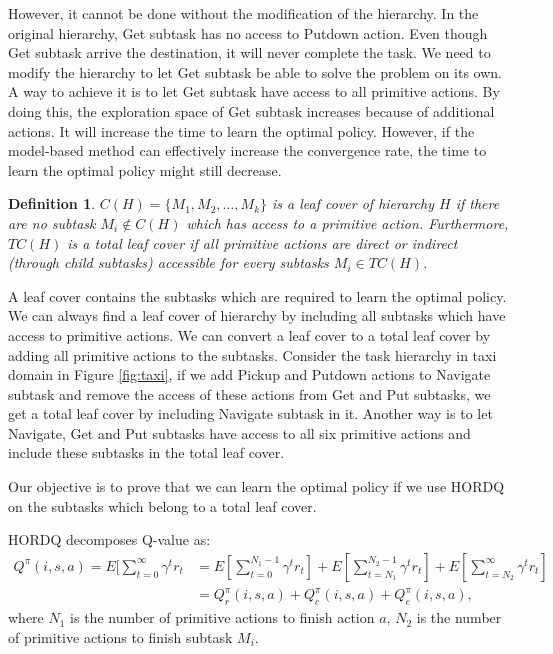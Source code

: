 \documentclass{article} %
\newtheorem{definition}{Definition}
\begin{document}
However, it cannot be done without the modification of the hierarchy. In the original hierarchy, 
Get subtask has no access to Putdown action. Even though Get subtask arrive the destination,
it will never complete the task. We need to modify the hierarchy to let Get subtask be
able to solve the problem on its own. A way to achieve it is to let Get subtask have access
to all primitive actions. By doing this, the exploration space of Get subtask increases
because of additional actions. It will increase 
the time to learn the optimal policy. However, if the model-based method can effectively increase
the convergence rate, the time to learn the optimal policy might still decrease.


\begin{definition}
    $C(H) = \{M_1, M_2, \dots, M_k\}$ is a leaf cover of hierarchy $H$ 
    if there are no subtask $M_i \notin C(H)$ which has access to a primitive action.
    Furthermore, $TC(H)$ is a total leaf cover if all primitive actions are direct or indirect (through child subtasks) accessible for every 
    subtasks $M_i \in TC(H)$.
\end{definition}

A leaf cover contains the subtasks which are required to learn the optimal policy.
We can always find a leaf cover of hierarchy by including all subtasks which have access
to primitive actions. We can convert a leaf cover to a total leaf cover by 
adding all primitive actions to the subtasks. 
Consider the task hierarchy in taxi domain in Figure \ref{fig:taxi},
if we add Pickup and Putdown actions to Navigate subtask and remove the access of these actions from Get and Put subtasks,
we get a total leaf cover by including Navigate subtask in it. Another way is to let Navigate, Get and Put subtasks
have access to all six primitive actions and include these subtasks in the total leaf cover. 

Our objective is to prove that we can learn the optimal policy if we use HORDQ \cite{HORDQ} on the subtasks which 
belong to a total leaf cover.

HORDQ decomposes Q-value as:
\begin{align}
    \label{eq:HordQ}
    Q^{\pi}(i, s, a) = E[\sum_{t=0}^{\infty}\gamma^t r_t &= E[\sum_{t=0}^{N_1 - 1}\gamma^t r_t] + E[\sum_{t=N_1}^{N_2 - 1}\gamma^t r_t] + E[\sum_{t=N_2}^{\infty}\gamma^t r_t]\\
                    &= Q_r^{\pi}(i, s, a) + Q_c^{\pi}(i, s, a) + Q_e^{\pi}(i, s, a),
\end{align}
where $N_1$ is the number of primitive actions to finish action $a$, $N_2$ is the number of primitive actions 
to finish subtask $M_i$. 
\end{document}
